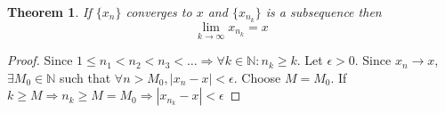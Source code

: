 \documentclass[12pt]{article}
\newtheorem{theorem}{Theorem}
\begin{document}
\begin{theorem}
    If \(\{x_n\}\) converges to \(x\) and \(\{x_{n_k}\}\) is a subsequence 
    then 
    \[
        \displaystyle\lim_{k\to\infty} x_{n_k} = x
    \]
        
    
\end{theorem}
\begin{proof}
    Since \(1 \leq n_1 < n_2 < n_3 < \dots \Rightarrow \forall 
    k \in \mathbb N : n_k \geq k\). 
    Let \(\epsilon > 0\). Since \(x_n \to x\), \(\exists M_0 \in \mathbb N\) such that 
    \(\forall n > M_0, |x_n - x| < \epsilon\).
    Choose \(M = M_0\). 
    If \(k \geq M \Rightarrow n_k \geq M = M_0 \Rightarrow |x_{n_k} - x| < \epsilon\)
        
    
\end{proof}
\end{document}
